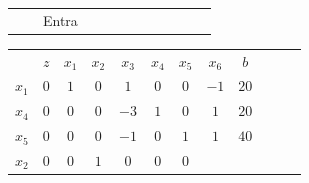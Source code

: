 \begin{frame}
{\begin{table}
\begin{tabular}{c c c c c c c c c c c c}
				& & Entra \\
			\end{tabular}
		\end{table}	
	}	
	{
		\begin{table}
			\begin{tabular}{c c c c c c c c c c c c}
				& \cellcolor{blue!80} \color{white} $ \scriptstyle z$
				& \cellcolor{blue!80} \color{red} $ \scriptstyle x_1$ 
				& \cellcolor{blue!80} \color{red} $ \scriptstyle x_2$
				& \cellcolor{blue!80} \color{white} $ \scriptstyle x_3$
				& \cellcolor{blue!80} \color{red} $ \scriptstyle x_4$
				& \cellcolor{blue!80} \color{red} $ \scriptstyle x_5$
				& \cellcolor{blue!80} \color{white} $ \scriptstyle x_6$ 
				& \cellcolor{blue!80} \color{white} $ \scriptstyle b$ \\
				\cellcolor{blue!80} \color{red} $ \scriptstyle x_1$
				& \cellcolor{yellow!60}  $ \scriptstyle 0$
				& \cellcolor{yellow!60}  $ \scriptstyle 1$ 
				& \cellcolor{yellow!60}  $ \scriptstyle 0$
				& \cellcolor{yellow!60}  $ \scriptstyle 1$
				& \cellcolor{yellow!60}  $ \scriptstyle 0$
				& \cellcolor{yellow!60}  $ \scriptstyle 0$
				& \cellcolor{yellow!60}  $ \scriptstyle -1$ 
				& \cellcolor{yellow!60}  $ \scriptstyle 20$ \\ 
				\cellcolor{blue!80} \color{red} $ \scriptstyle x_4$
				& \cellcolor{yellow!60}  $ \scriptstyle 0$
				& \cellcolor{yellow!60}  $ \scriptstyle 0$ 
				& \cellcolor{yellow!60}  $ \scriptstyle 0$
				& \cellcolor{yellow!60}  $ \scriptstyle -3$
				& \cellcolor{yellow!60}  $ \scriptstyle 1$
				& \cellcolor{yellow!60}  $ \scriptstyle 0$
				& \cellcolor{yellow!60}  $ \scriptstyle 1$ 
				& \cellcolor{yellow!60}  $ \scriptstyle 20$ \\ 
				\cellcolor{blue!80} \color{red} $ \scriptstyle x_5$  
				& \cellcolor{yellow!60}  $ \scriptstyle 0$
				& \cellcolor{yellow!60}  $ \scriptstyle 0$ 
				& \cellcolor{yellow!60}  $ \scriptstyle 0$
				& \cellcolor{yellow!60}  $ \scriptstyle -1$
				& \cellcolor{yellow!60}  $ \scriptstyle 0$
				& \cellcolor{yellow!60}  $ \scriptstyle 1$
				& \cellcolor{yellow!60}  $ \scriptstyle 1$ 
				& \cellcolor{yellow!60}  $ \scriptstyle 40$ \\
				\cellcolor{blue!80} \color{red} $ \scriptstyle x_2$
				& \cellcolor{yellow!60}  $ \scriptstyle 0$
				& \cellcolor{yellow!60}  $ \scriptstyle 0$ 
				& \cellcolor{yellow!60}  $ \scriptstyle 1$
				& \cellcolor{yellow!60}  $ \scriptstyle 0$
				& \cellcolor{yellow!60}  $ \scriptstyle 0$
				& \cellcolor{yellow!60}  $ \scriptstyle 0$

\end{tabular}
\end{table}}
\end{frame}
